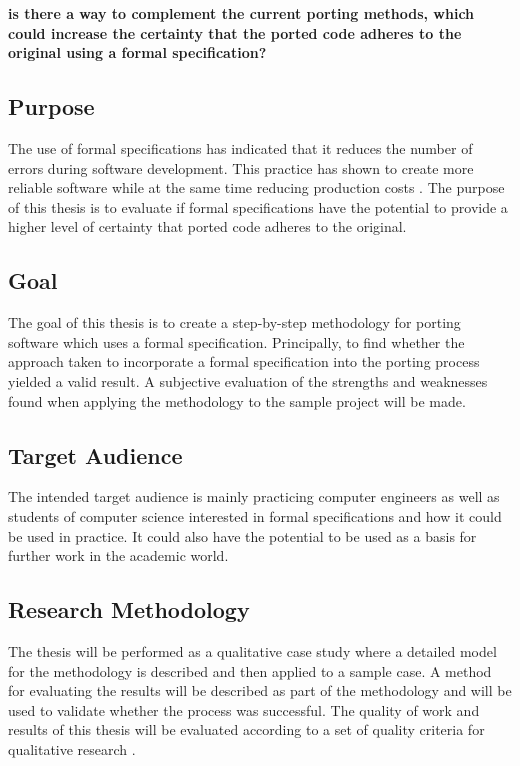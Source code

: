 \textbf{is there a way to complement the current porting methods, which could increase the certainty that the ported code adheres to the original using a formal specification?}


\subsection{Purpose}

The use of formal specifications has indicated that it reduces the number of errors during software development. This practice has shown to create more reliable software while at the same time reducing production costs \cite{AMAZONFORMALSPEC}. The purpose of this thesis is to evaluate if formal specifications have the potential to provide a higher level of certainty that ported code adheres to the original. 

\subsection{Goal}
 
The goal of this thesis is to create a step-by-step methodology for porting software which uses a formal specification. Principally, to find whether the approach taken to incorporate a formal specification into the porting process yielded a valid result. A subjective evaluation of the strengths and weaknesses found when applying the methodology to the sample project will be made. 


\subsection{Target Audience}
The intended target audience is mainly practicing computer engineers as well as students of computer science interested in formal specifications and how it could be used in practice. It could also have the potential to be used as a basis for further work in the academic world.  

\subsection{Research Methodology}
The thesis will be performed as a qualitative case study where a detailed model for the methodology is described and then applied to a sample case. A method for evaluating the results will be described as part of the methodology and will be used to validate whether the process was successful. The quality of work and results of this thesis will be evaluated according to a set of quality criteria for qualitative research \cite{QUALITATIVE}.

